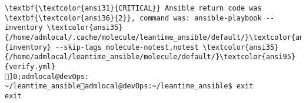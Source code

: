 \documentclass{scrartcl}
\begin{document}
\begin{Verbatim}
\textbf{\textcolor{ansi31}{CRITICAL}} Ansible return code was \textbf{\textcolor{ansi36}{2}}, command was: ansible-playbook --inventory \textcolor{ansi35}{/home/admlocal/.cache/molecule/leantime_ansible/default/}\textcolor{ansi95}{inventory} --skip-tags molecule-notest,notest \textcolor{ansi35}{/home/admlocal/leantime_ansible/molecule/default/}\textcolor{ansi95}{verify.yml}
]0;admlocal@devOps: ~/leantime_ansibleadmlocal@devOps:~/leantime_ansible$ exit
exit

\end{Verbatim}
\end{document}
